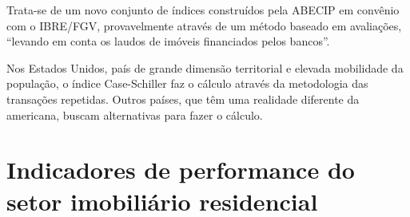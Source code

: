 \documentclass[
	12pt,				%
	oneside,			%
	a4paper,			%
	chapter=TITLE,		%
	section=TITLE,		%
	english,			%
	brazil				%
	]{abntex2}
\begin{document}
Trata-se de um novo conjunto de índices construídos pela \gls{ABECIP} em
convênio com o \gls{IBRE}/\gls{FGV}, provavelmente através de um método baseado
em avaliações, ``levando em conta os laudos de imóveis financiados pelos bancos''.
\begin{citacao}
Nos Estados Unidos, país de grande dimensão territorial e elevada mobilidade
da população, o índice Case-Schiller faz o cálculo através da metodologia das
transações repetidas. Outros países, que têm uma realidade diferente da
americana, buscam alternativas para fazer o cálculo.
\end{citacao}
\hypertarget{indicadores-de-performance-do-setor-imobiliuxe1rio-residencial}{%
\section{Indicadores de performance do setor imobiliário residencial}\label{indicadores-de-performance-do-setor-imobiliuxe1rio-residencial}}
\end{document}
